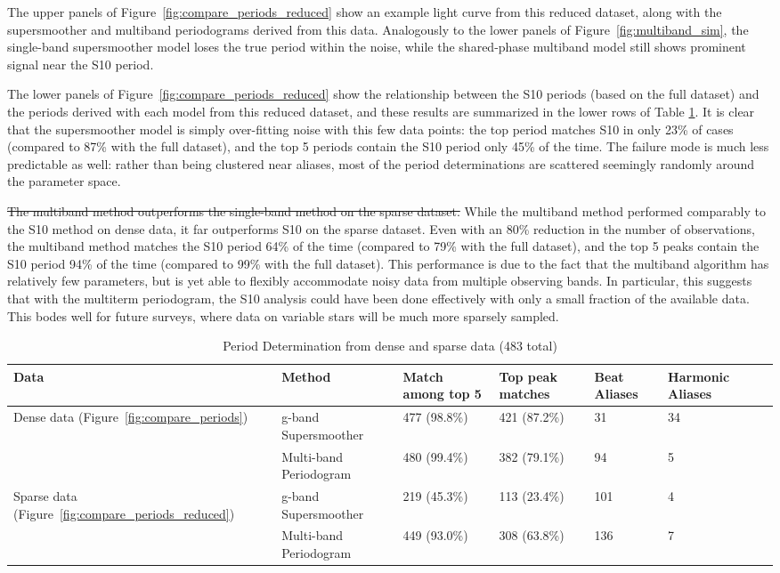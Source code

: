 \documentclass{emulateapj}
\newcommand{\Fig}[1]{Figure~\ref{fig:#1}}
\newcommand{\fig}[1]{\Fig{#1}}
\newcommand{\new}[1]{{\color{red} #1}}
\newcommand{\old}[1]{{\sout{#1}}}
\begin{document}
The upper panels of \fig{compare_periods_reduced} show an example light curve from this reduced dataset, along with the supersmoother and multiband periodograms derived from this data. Analogously to the lower panels of \fig{multiband_sim}, the single-band supersmoother model loses the true period within the noise, while the shared-phase multiband model still shows prominent signal near the S10 period.

The lower panels of \fig{compare_periods_reduced} show the relationship between the S10 periods (based on the full dataset) and the periods derived with each model from this reduced dataset, \new{and these results are summarized in the lower rows of Table \ref{table:results}}. It is clear that the supersmoother model is simply over-fitting noise with this few data points: the top period matches S10 in only 23\% of cases (compared to 87\% with the full dataset), and the top 5 periods contain the S10 period only 45\% of the time. The failure mode is much less predictable as well: rather than being clustered near aliases, most of the period determinations are scattered seemingly randomly around the parameter space.

\old{The multiband method outperforms the single-band method on the sparse dataset.} \new{While the multiband method performed comparably to the S10 method on dense data, it far outperforms S10 on the sparse dataset.} Even with an 80\% reduction in the number of observations, the multiband method matches the S10 period 64\% of the time (compared to 79\% with the full dataset), and the top 5 peaks contain the S10 period 94\% of the time (compared to 99\% with the full dataset). This performance is due to the fact that the multiband algorithm has relatively few parameters, but is yet able to flexibly accommodate noisy data from multiple observing bands. In particular, this suggests that with the multiterm periodogram, the S10 analysis could have been done effectively with only a small fraction of the available data. This bodes well for future surveys, where data on variable stars will be much more sparsely sampled.


\begin{table}
\centering
  \caption{Period Determination from dense and sparse data (483 total)}
  \begin{tabular}{|l|l|l|l|l|l|l|}
  \hline
   Data & Method & Match among top 5 & Top peak matches & Beat Aliases & Harmonic Aliases  \\
  \hline\hline
  Dense data (\fig{compare_periods})
  & g-band Supersmoother & 477 (98.8\%) & 421 (87.2\%)& 31 & 34 \\
  & Multi-band Periodogram & 480 (99.4\%) & 382 (79.1\%) & 94 & 5 \\
  \hline\hline
  Sparse data (\fig{compare_periods_reduced})
  & g-band Supersmoother & 219 (45.3\%) & 113 (23.4\%) & 101 & 4 \\
  & Multi-band Periodogram & 449 (93.0\%) & 308 (63.8\%) & 136 & 7 \\
  \hline
  \end{tabular}
  \label{table:results}
\end{table}
\end{document}
